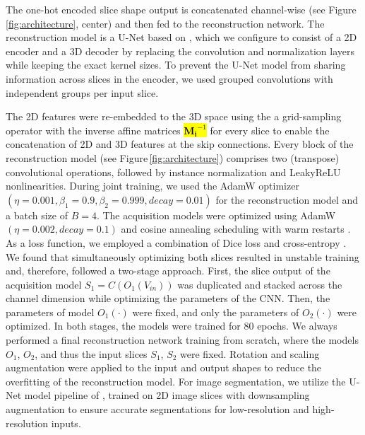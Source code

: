     The one-hot encoded slice shape output is concatenated channel-wise (see Figure\,\ref{fig:architecture}, center)
    and then fed to the reconstruction network.
    The reconstruction model is a U-Net based on \cite{isensee2021nnu}, which we configure to consist of a 2D encoder and a 3D decoder by replacing the convolution and normalization layers while keeping the exact kernel sizes.
    To prevent the U-Net model from sharing information across slices in the encoder, we used grouped convolutions with independent groups per input slice.

    The 2D features were re-embedded to the 3D space using the a grid-sampling operator with the inverse affine matrices \hl{$\mathbf{M_i}^{-1}$} for every slice to enable the concatenation of 2D and 3D features at the skip connections. %
    Every block of the reconstruction model (see Figure\,\ref{fig:architecture}) comprises two (transpose) convolutional operations, followed by instance normalization and LeakyReLU nonlinearities.
    During joint training, we used the AdamW optimizer \cite{loshchilov2017decoupled} $(\eta=0.001, \beta_1=0.9, \beta_2=0.999, decay=0.01)$ for the reconstruction model and a batch size of $B=4$.
    The acquisition models were optimized using AdamW $(\eta=0.002, decay=0.1)$ and cosine annealing scheduling with warm restarts \cite{loshchilov2016sgdr}.
    As a loss function, we employed a combination of Dice loss and cross-entropy \cite{isensee2021nnu}.
    We found that simultaneously optimizing both slices resulted in unstable training and, therefore, followed a two-stage approach. First, the slice output of the acquisition model $S_1 = C(O_1(V_{in}))$ was duplicated and stacked across the channel dimension while optimizing the parameters of the CNN. Then, the parameters of model $O_1(\cdot)$ were fixed, and only the parameters of $O_2(\cdot)$ were optimized. In both stages, the models were trained for 80 epochs.
    We always performed a final reconstruction network training from scratch, where the models $O_1$, $O_2$, and thus the input slices $S_1$, $S_2$ were fixed.
    Rotation and scaling augmentation were applied to the input and output shapes to reduce the overfitting of the reconstruction model.
    For image segmentation, we utilize the U-Net model pipeline of \cite{isensee2021nnu}, trained on 2D image slices with downsampling augmentation to ensure accurate segmentations for low-resolution and high-resolution inputs.

